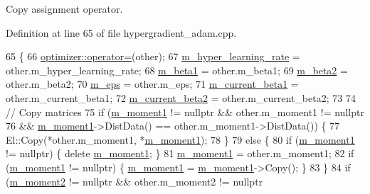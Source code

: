 Copy assignment operator. 

Definition at line 65 of file hypergradient\+\_\+adam.\+cpp.


\begin{DoxyCode}
65                                                                                  \{
66   \hyperlink{classlbann_1_1optimizer_ab7811e0a4d2d9b594140aed78b6de743}{optimizer::operator=}(other);
67   \hyperlink{classlbann_1_1hypergradient__adam_a1066721ebaadb4eed2554b159510ae44}{m\_hyper\_learning\_rate} = other.m\_hyper\_learning\_rate;
68   \hyperlink{classlbann_1_1hypergradient__adam_a876a8bc1ee9a47479008d204048724e7}{m\_beta1} = other.m\_beta1;
69   \hyperlink{classlbann_1_1hypergradient__adam_a0effe7359fa37f02a40f059281580760}{m\_beta2} = other.m\_beta2;
70   \hyperlink{classlbann_1_1hypergradient__adam_a5bae9101fcc235d961ae7713706f4ff7}{m\_eps} = other.m\_eps;
71   \hyperlink{classlbann_1_1hypergradient__adam_a671c622860c712ef9716c2c8c6714780}{m\_current\_beta1} = other.m\_current\_beta1;
72   \hyperlink{classlbann_1_1hypergradient__adam_a2d8b00faecbf4ce3996f879566ca4064}{m\_current\_beta2} = other.m\_current\_beta2;
73   
74   \textcolor{comment}{// Copy matrices}
75   \textcolor{keywordflow}{if} (\hyperlink{classlbann_1_1hypergradient__adam_a529f3b53732247ebfb649f55f1fae4d6}{m\_moment1} != \textcolor{keyword}{nullptr} && other.m\_moment1 != \textcolor{keyword}{nullptr}
76       && \hyperlink{classlbann_1_1hypergradient__adam_a529f3b53732247ebfb649f55f1fae4d6}{m\_moment1}->DistData() == other.m\_moment1->DistData()) \{
77     El::Copy(*other.m\_moment1, *\hyperlink{classlbann_1_1hypergradient__adam_a529f3b53732247ebfb649f55f1fae4d6}{m\_moment1});
78   \}
79   \textcolor{keywordflow}{else} \{
80     \textcolor{keywordflow}{if} (\hyperlink{classlbann_1_1hypergradient__adam_a529f3b53732247ebfb649f55f1fae4d6}{m\_moment1} != \textcolor{keyword}{nullptr}) \{ \textcolor{keyword}{delete} \hyperlink{classlbann_1_1hypergradient__adam_a529f3b53732247ebfb649f55f1fae4d6}{m\_moment1}; \}
81     \hyperlink{classlbann_1_1hypergradient__adam_a529f3b53732247ebfb649f55f1fae4d6}{m\_moment1} = other.m\_moment1;
82     \textcolor{keywordflow}{if} (\hyperlink{classlbann_1_1hypergradient__adam_a529f3b53732247ebfb649f55f1fae4d6}{m\_moment1} != \textcolor{keyword}{nullptr}) \{ \hyperlink{classlbann_1_1hypergradient__adam_a529f3b53732247ebfb649f55f1fae4d6}{m\_moment1} = \hyperlink{classlbann_1_1hypergradient__adam_a529f3b53732247ebfb649f55f1fae4d6}{m\_moment1}->Copy(); \}
83   \}
84   \textcolor{keywordflow}{if} (\hyperlink{classlbann_1_1hypergradient__adam_a73b77fb79bd8e9bbfc8f360197899d18}{m\_moment2} != \textcolor{keyword}{nullptr} && other.m\_moment2 != \textcolor{keyword}{nullptr}

\end{DoxyCode}
